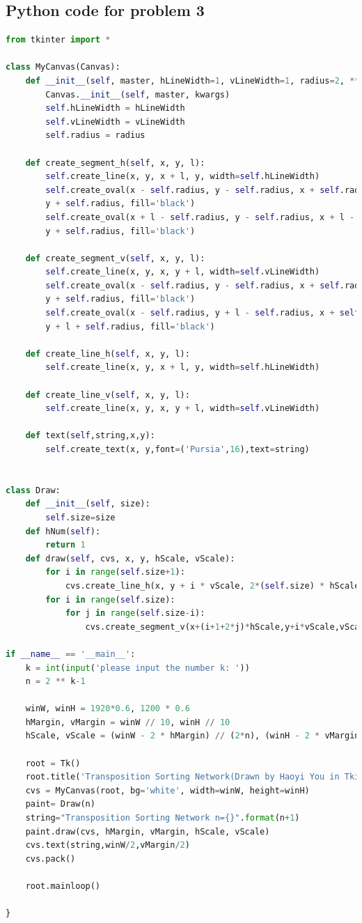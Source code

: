 \documentclass[12pt,a4paper]{article}
\theoremstyle{definition}
\begin{document}
\subsection{Python code for problem 3}
\begin{lstlisting}[language=Python,numberstyle=\tiny, 
        basicstyle=\small]
from tkinter import *

class MyCanvas(Canvas):
    def __init__(self, master, hLineWidth=1, vLineWidth=1, radius=2, **kwargs):
        Canvas.__init__(self, master, kwargs)
        self.hLineWidth = hLineWidth
        self.vLineWidth = vLineWidth
        self.radius = radius

    def create_segment_h(self, x, y, l):
        self.create_line(x, y, x + l, y, width=self.hLineWidth)
        self.create_oval(x - self.radius, y - self.radius, x + self.radius,
        y + self.radius, fill='black')
        self.create_oval(x + l - self.radius, y - self.radius, x + l - self.radius,
        y + self.radius, fill='black')

    def create_segment_v(self, x, y, l):
        self.create_line(x, y, x, y + l, width=self.vLineWidth)
        self.create_oval(x - self.radius, y - self.radius, x + self.radius, 
        y + self.radius, fill='black')
        self.create_oval(x - self.radius, y + l - self.radius, x + self.radius, 
        y + l + self.radius, fill='black')

    def create_line_h(self, x, y, l):
        self.create_line(x, y, x + l, y, width=self.hLineWidth)

    def create_line_v(self, x, y, l):
        self.create_line(x, y, x, y + l, width=self.vLineWidth)

    def text(self,string,x,y):
        self.create_text(x, y,font=('Pursia',16),text=string)


class Draw:
    def __init__(self, size):
        self.size=size
    def hNum(self):
        return 1
    def draw(self, cvs, x, y, hScale, vScale):
        for i in range(self.size+1):
            cvs.create_line_h(x, y + i * vScale, 2*(self.size) * hScale)
        for i in range(self.size):
            for j in range(self.size-i):
                cvs.create_segment_v(x+(i+1+2*j)*hScale,y+i*vScale,vScale)

if __name__ == '__main__':
    k = int(input('please input the number k: '))
    n = 2 ** k-1

    winW, winH = 1920*0.6, 1200 * 0.6
    hMargin, vMargin = winW // 10, winH // 10
    hScale, vScale = (winW - 2 * hMargin) // (2*n), (winH - 2 * vMargin) // (n)

    root = Tk()
    root.title('Transposition Sorting Network(Drawn by Haoyi You in Tkinter)')
    cvs = MyCanvas(root, bg='white', width=winW, height=winH)
    paint= Draw(n)
    string="Transposition Sorting Network n={}".format(n+1)
    paint.draw(cvs, hMargin, vMargin, hScale, vScale)
    cvs.text(string,winW/2,vMargin/2)
    cvs.pack()

    root.mainloop()

}
\end{lstlisting}
\end{document}
